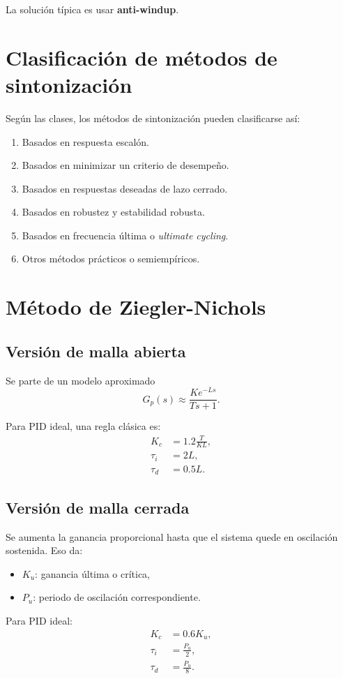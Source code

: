\documentclass[11pt]{article}
\begin{document}
La soluci\'on t\'ipica es usar \textbf{anti-windup}.

\section{Clasificaci\'on de m\'etodos de sintonizaci\'on}
Seg\'un las clases, los m\'etodos de sintonizaci\'on pueden clasificarse as\'i:
\begin{enumerate}[label=\arabic*.]
\item Basados en respuesta escal\'on.
\item Basados en minimizar un criterio de desempe\~no.
\item Basados en respuestas deseadas de lazo cerrado.
\item Basados en robustez y estabilidad robusta.
\item Basados en frecuencia \'ultima o \emph{ultimate cycling}.
\item Otros m\'etodos pr\'acticos o semiemp\'iricos.
\end{enumerate}

\section{M\'etodo de Ziegler-Nichols}
\subsection{Versi\'on de malla abierta}
Se parte de un modelo aproximado
\[
G_p(s)\approx \frac{Ke^{-Ls}}{Ts+1}.
\]

Para PID ideal, una regla cl\'asica es:
\begin{align}
K_c &= 1.2\frac{T}{KL},\\
\tau_i &= 2L,\\
\tau_d &= 0.5L.
\end{align}

\subsection{Versi\'on de malla cerrada}
Se aumenta la ganancia proporcional hasta que el sistema quede en oscilaci\'on sostenida. Eso da:
\begin{itemize}
\item $K_u$: ganancia \'ultima o cr\'itica,
\item $P_u$: periodo de oscilaci\'on correspondiente.
\end{itemize}

Para PID ideal:
\begin{align}
K_c &= 0.6K_u,\\
\tau_i &= \frac{P_u}{2},\\
\tau_d &= \frac{P_u}{8}.
\end{align}
\end{document}
